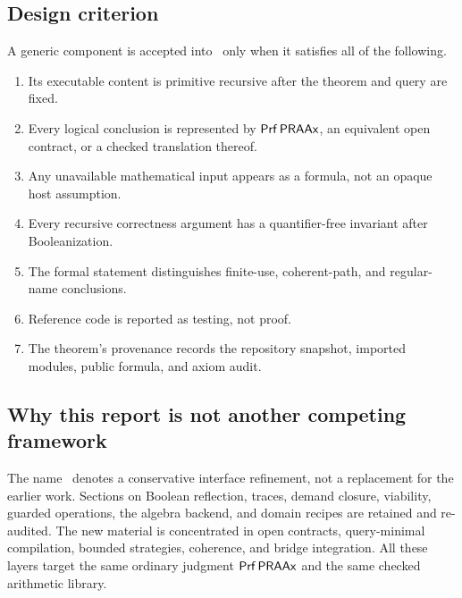 \subsection{Design criterion}

A generic component is accepted into \KIFCS\ only when it satisfies all of the following.
\begin{enumerate}[label=(\alph*)]
  \item Its executable content is primitive recursive after the theorem and query are fixed.
  \item Every logical conclusion is represented by \(\mathsf{Prf}\,\mathsf{PRAAx}\), an equivalent open contract, or a checked translation thereof.
  \item Any unavailable mathematical input appears as a formula, not an opaque host assumption.
  \item Every recursive correctness argument has a quantifier-free invariant after Booleanization.
  \item The formal statement distinguishes finite-use, coherent-path, and regular-name conclusions.
  \item Reference code is reported as testing, not proof.
  \item The theorem's provenance records the repository snapshot, imported modules, public formula, and axiom audit.
\end{enumerate}

\subsection{Why this report is not another competing framework}

The name \KIFCS\ denotes a conservative interface refinement, not a replacement for the earlier work.  Sections on Boolean reflection, traces, demand closure, viability, guarded operations, the algebra backend, and domain recipes are retained and re-audited.  The new material is concentrated in open contracts, query-minimal compilation, bounded strategies, coherence, and bridge integration.  All these layers target the same ordinary judgment \(\mathsf{Prf}\,\mathsf{PRAAx}\) and the same checked arithmetic library.
